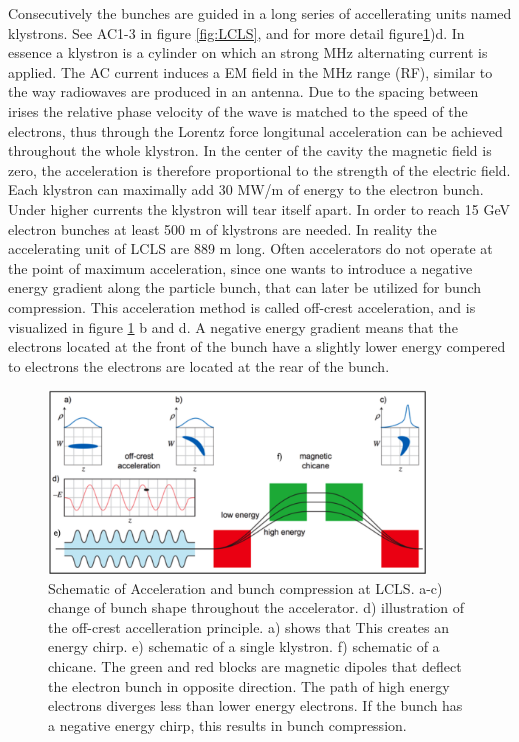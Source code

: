 Consecutively the bunches are guided in a long series of accellerating units named klystrons. See AC1-3 in figure \ref{fig:LCLS}, and for more detail figure\ref{fig:AC})d. In essence a klystron is a cylinder on which an strong MHz alternating current is applied. The AC current induces a EM field in the MHz range (RF), similar to the way radiowaves are produced in an antenna. Due to the spacing between irises the relative phase velocity of the wave is matched to the speed of the electrons, thus through the Lorentz force longitunal acceleration can be achieved throughout the whole klystron. In the center of the cavity the magnetic field is zero, the acceleration is therefore proportional to the strength of the electric field. Each klystron can maximally add 30 MW/m of energy to the electron bunch. Under higher currents the klystron will tear itself apart. In order to reach 15 GeV electron bunches at least 500 m of klystrons are needed. In reality the accelerating unit of LCLS are 889 m long. Often accelerators do not operate at the point of maximum acceleration, since one wants to introduce a negative energy gradient along the particle bunch, that can later be utilized for bunch compression. This acceleration method is called off-crest acceleration, and is visualized in figure  \ref{fig:AC} b and d. A negative energy gradient means that the electrons located at the front of the bunch have a slightly lower energy compered to electrons the electrons are located at the rear of the bunch.

\begin{figure}[h]\label{fig:AC}
\centering
\includegraphics[width=100mm]{Chapter_03_Acceleration.png}
\caption{Schematic of Acceleration and bunch compression at LCLS. a-c) change of bunch shape throughout the accelerator. d) illustration of the off-crest accelleration principle. a) shows that  This creates an energy chirp. e) schematic of a single klystron. f) schematic of a chicane. The green and red blocks are magnetic dipoles that deflect the electron bunch in opposite direction. The path of high energy electrons diverges less than lower energy electrons. If the bunch has a negative energy chirp, this results in bunch compression.}
\end{figure}

